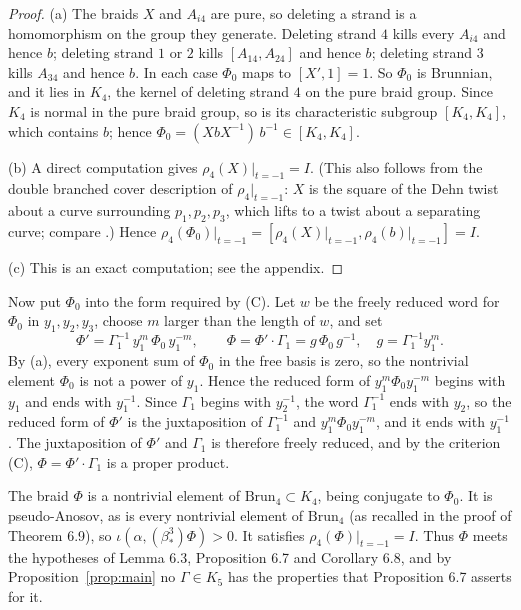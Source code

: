 \documentclass[11pt]{amsart}
\theoremstyle{remark}
\newcommand{\Brun}{\mathrm{Brun}}
\newcommand{\bs}{\beta^3_*}
\newcommand{\at}{\big|_{t=-1}}
\begin{document}
\begin{proof}
(a) The braids $X$ and $A_{i4}$ are pure, so deleting a strand is a homomorphism on the group they generate. Deleting strand $4$ kills every $A_{i4}$ and hence $b$; deleting strand $1$ or $2$ kills $[A_{14},A_{24}]$ and hence $b$; deleting strand $3$ kills $A_{34}$ and hence $b$. In each case $\Phi_0$ maps to $[X',1]=1$. So $\Phi_0$ is Brunnian, and it lies in $K_4$, the kernel of deleting strand $4$ on the pure braid group. Since $K_4$ is normal in the pure braid group, so is its characteristic subgroup $[K_4,K_4]$, which contains $b$; hence $\Phi_0=(XbX^{-1})\,b^{-1}\in[K_4,K_4]$.

(b) A direct computation gives $\rho_4(X)\at=I$. (This also follows from the double branched cover description of $\rho_4\at$: $X$ is the square of the Dehn twist about a curve surrounding $p_1,p_2,p_3$, which lifts to a twist about a separating curve; compare \cite{BMP}.) Hence $\rho_4(\Phi_0)\at=[\rho_4(X)\at,\rho_4(b)\at]=I$.

(c) This is an exact computation; see the appendix.
\end{proof}

Now put $\Phi_0$ into the form required by (C). Let $w$ be the freely reduced word for $\Phi_0$ in $y_1,y_2,y_3$, choose $m$ larger than the length of $w$, and set
\[
\Phi'=\Gamma_1^{-1}\,y_1^{m}\,\Phi_0\,y_1^{-m},\qquad \Phi=\Phi'\cdot\Gamma_1=g\,\Phi_0\,g^{-1},\quad g=\Gamma_1^{-1}y_1^{m}.
\]
By (a), every exponent sum of $\Phi_0$ in the free basis is zero, so the nontrivial element $\Phi_0$ is not a power of $y_1$. Hence the reduced form of $y_1^m\Phi_0y_1^{-m}$ begins with $y_1$ and ends with $y_1^{-1}$. Since $\Gamma_1$ begins with $y_2^{-1}$, the word $\Gamma_1^{-1}$ ends with $y_2$, so the reduced form of $\Phi'$ is the juxtaposition of $\Gamma_1^{-1}$ and $y_1^m\Phi_0y_1^{-m}$, and it ends with $y_1^{-1}$. The juxtaposition of $\Phi'$ and $\Gamma_1$ is therefore freely reduced, and by the criterion (C), $\Phi=\Phi'\cdot\Gamma_1$ is a proper product.

The braid $\Phi$ is a nontrivial element of $\Brun_4\subset K_4$, being conjugate to $\Phi_0$. It is pseudo-Anosov, as is every nontrivial element of $\Brun_4$ (as recalled in the proof of Theorem 6.9), so $\iota(\alpha,(\bs)\Phi)>0$. It satisfies $\rho_4(\Phi)\at=I$. Thus $\Phi$ meets the hypotheses of Lemma 6.3, Proposition 6.7 and Corollary 6.8, and by Proposition~\ref{prop:main} no $\Gamma\in K_5$ has the properties that Proposition 6.7 asserts for it.
\end{document}
